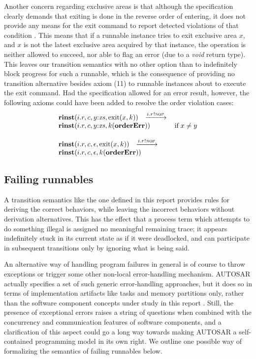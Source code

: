\documentclass[10pt,conference]{IEEEtran}
\begin{document}
Another concern regarding exclusive areas is that although the specification clearly demands that exiting is done in the reverse order of entering, it does not provide any means for the exit command to report detected violations of that condition \cite[ch.~5.6.29]{AR:RTE}. This means that if a runnable instance tries to exit exclusive area $x$, and $x$ is not the latest exclusive area acquired by that instance, the operation is neither allowed to succeed, nor able to flag an error (due to a \emph{void} return type). This leaves our transition semantics with no other option than to indefinitely block progress for such a runnable, which is the consequence of providing no transition alternative besides axiom (11) to runnable instances about to execute the exit command. Had the specification allowed for an error result, however, the following axioms could have been added to resolve the order violation cases:
$$
\begin{array}{lcll}
		{\Trinst {i.r} c {\Tcons y \Xs} {\TrteExit x k}}
		\;\; \red{\Tsay {i.r} \Tnop} \\
		{\Trinst {i.r} c {\Tcons y \Xs} {\Tap k {\kw{orderErr}}}}
		& \Pif\;x \neq y
\\ \\
		{\Trinst {i.r} c \Teps {\TrteExit x k}}
		\;\; \red{\Tsay {i.r} \Tnop} \\
		{\Trinst {i.r} c \Teps {\Tap k {\kw{orderErr}}}}

\end{array}
$$


\subsection{Failing runnables}

A transition semantics like the one defined in this report provides rules for deriving the correct behaviors, while leaving the incorrect behaviors without derivation alternatives. This has the effect that a process term which attempts to do something illegal is assigned no meaningful remaining trace; it appears indefinitely stuck in its current state as if it were deadlocked, and can participate in subsequent transitions only by ignoring what is being said.

An alternative way of handling program failures in general is of course to throw exceptions or trigger some other non-local error-handling mechanism. AUTOSAR actually specifies a set of such generic error-handling approaches, but it does so in terms of implementation artifacts like tasks and memory partitions only, rather than the software component concepts under study in this report \cite{AR:ERR}. Still, the presence of exceptional errors raises a string of questions when combined with the concurrency and communication features of software components, and a clarification of this aspect could go a long way towards making AUTOSAR a self-contained programming model in its own right. We outline one possible way of formalizing the semantics of failing runnables below.
\end{document}
